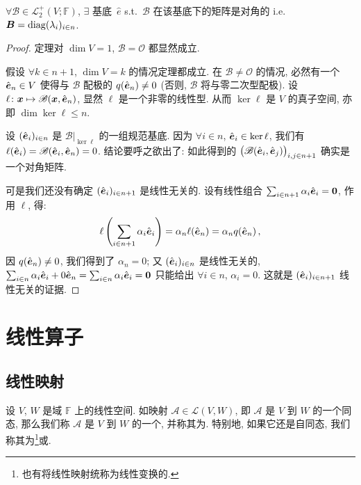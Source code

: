\documentclass[openany, a5paper, oneside]{ctexbook}
\newcommand*{\inbasis}[2]{\left.%
	{#1}\right|_{#2}
}
\begin{document}
\begin{theorem}[二次型的规范型存在]
	$\forall \mathscr B \in \mathcal L^+_2(V; \mathbb F)$, $\exists$ 基底~$\hat e$ s.t.\ $\mathscr B$ 在该基底下的矩阵是对角的 i.e.\ $\boldsymbol{B} = \operatorname{diag}(\lambda_i)_{i \in n}$.
\end{theorem}
\begin{proof}
	定理对 $\dim V = 1$, $\mathscr B = \mathscr O$ 都显然成立. 

	假设 $\forall k \in n + 1$, $\dim V = k$ 的情况定理都成立. 
	在 $\mathscr B \neq \mathscr O$ 的情况, 必然有一个 $\hat{\boldsymbol{e}}_n \in V$ 使得与 $\mathscr B$ 配极的 $q(\hat{\boldsymbol{e}}_n) \neq 0$ 
		(否则, $\mathscr B$ 将与零二次型配极).
	设 $\ell \colon \boldsymbol{x} \mapsto \mathscr B(\boldsymbol{x}, \hat{\boldsymbol{e}}_n)$, 显然 $\ell$ 是一个非零的线性型. 
	从而 $\ker \ell$ 是 $V$ 的真子空间, 亦即 $\dim \ker \ell \leq n $.

	设 $(\hat{\boldsymbol{e}}_i)_{i \in n}$ 是 $\inbasis{\mathscr B}{\ker \ell}$ 的一组规范基底. 
	因为 $\forall i \in n$, $\hat{\boldsymbol{e}}_i \in \ker \ell$, 我们有 $\ell(\hat{\boldsymbol{e}}_i) = \mathscr B(\hat{\boldsymbol{e}}_i, \hat{\boldsymbol{e}}_n) = 0$. 
	结论要呼之欲出了: 如此得到的 $\big(\mathscr B(\hat{\boldsymbol{e}}_i, \hat{\boldsymbol{e}}_j)\big)_{i, j \in n + 1}$ 确实是一个对角矩阵.

	可是我们还没有确定 $(\hat{\boldsymbol{e}}_i)_{i \in n + 1}$ 是线性无关的. 
	设有线性组合 $\sum_{i \in n + 1} \alpha_i \hat{\boldsymbol{e}}_i = \boldsymbol{0}$, 作用 $\ell$, 得:
	\begin{equation*}
		\ell\left( 
			\sum_{i \in n + 1} \alpha_i \hat{\boldsymbol{e}}_i
		 \right)
		= \alpha_n \ell(\hat{\boldsymbol{e}}_n)
		= \alpha_n q(\hat{\boldsymbol{e}}_n)\,,
	\end{equation*}
	因 $q(\hat{\boldsymbol{e}}_n) \neq 0$, 我们得到了 $\alpha_n = 0$; 
	又 $(\hat{\boldsymbol{e}}_i)_{i \in n}$ 是线性无关的, $\sum_{i \in n} \alpha_i \hat{\boldsymbol{e}}_i + 0\hat{\boldsymbol{e}}_n = \sum_{i \in n} \alpha_i \hat{\boldsymbol{e}}_i = \boldsymbol{0}$ 只能给出 $\forall i \in n$, $\alpha_i = 0$. 这就是 $(\hat{\boldsymbol{e}}_i)_{i \in n + 1}$ 线性无关的证据.

\end{proof}

\chapter{线性算子}
\section{线性映射}
	\label{section:线性映射}

\begin{definition}[线性映射]
	设 $V$, $W$ 是域 $\mathbb F$ 上的线性空间. 
	如映射 $\mathscr A \in \mathcal L (V, W)$, 即 $\mathscr A$ 是 $V$ 到 $W$ 的一个同态, 那么我们称 $\mathscr A$ 是 $V$ 到 $W$ 的一个, 并称其为. 特别地, 如果它还是自同态, 我们称其为\footnote{也有将线性映射统称为线性变换的. }或.
\end{definition}
\end{document}
